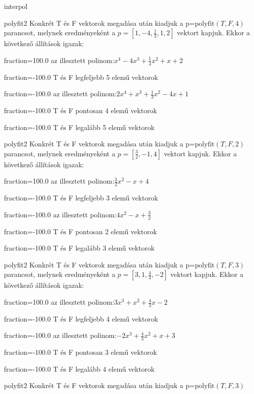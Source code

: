 \documentclass[12pt]{article}
\begin{document}
\begin{quiz}{interpol}
\begin{multi}[multiple]{polyfit2}
Konkrét T és F vektorok megadása után kiadjuk a p=$\mathrm{polyfit}(T,F,4)$
parancsot, melynek eredményeként a $p=\left[1,-4,\frac{1}{3},1,2\right]$ vektort kapjuk.
Ekkor a következő állítások igazak:
\item[fraction=100.0] az illesztett polinom:$x^4-4x^3+\frac{1}{3}x^2+x+2$
\item[fraction=-100.0]  T és F legfeljebb 5 elemű vektorok
\item[fraction=-100.0]  az illesztett polinom:$2x^4+x^3+\frac{1}{3}x^2-4x+1$
\item[fraction=-100.0]  T és F pontosan 4 elemű vektorok
\item[fraction=-100.0] T és F legalább 5 elemű vektorok
\end{multi}
\begin{multi}[multiple]{polyfit2}
Konkrét T és F vektorok megadása után kiadjuk a p=$\mathrm{polyfit}(T,F,2)$
parancsot, melynek eredményeként a $p=\left[\frac{3}{2},-1,4\right]$ vektort kapjuk.
Ekkor a következő állítások igazak:
\item[fraction=100.0] az illesztett polinom:$\frac{3}{2}x^2-x+4$
\item[fraction=-100.0]  T és F legfeljebb 3 elemű vektorok
\item[fraction=-100.0]  az illesztett polinom:$4x^2-x+\frac{3}{2}$
\item[fraction=-100.0]  T és F pontosan 2 elemű vektorok
\item[fraction=-100.0] T és F legalább 3 elemű vektorok
\end{multi}
\begin{multi}[multiple]{polyfit2}
Konkrét T és F vektorok megadása után kiadjuk a p=$\mathrm{polyfit}(T,F,3)$
parancsot, melynek eredményeként a $p=\left[3,1,\frac{4}{3},-2\right]$ vektort kapjuk.
Ekkor a következő állítások igazak:
\item[fraction=100.0] az illesztett polinom:$3x^3+x^2+\frac{4}{3}x-2$
\item[fraction=-100.0]  T és F legfeljebb 4 elemű vektorok
\item[fraction=-100.0]  az illesztett polinom:$-2x^3+\frac{4}{3}x^2+x+3$
\item[fraction=-100.0]  T és F pontosan 3 elemű vektorok
\item[fraction=-100.0] T és F legalább 4 elemű vektorok
\end{multi}
\begin{multi}[multiple]{polyfit2}
Konkrét T és F vektorok megadása után kiadjuk a p=$\mathrm{polyfit}(T,F,3)$

\end{multi}
\end{quiz}
\end{document}
